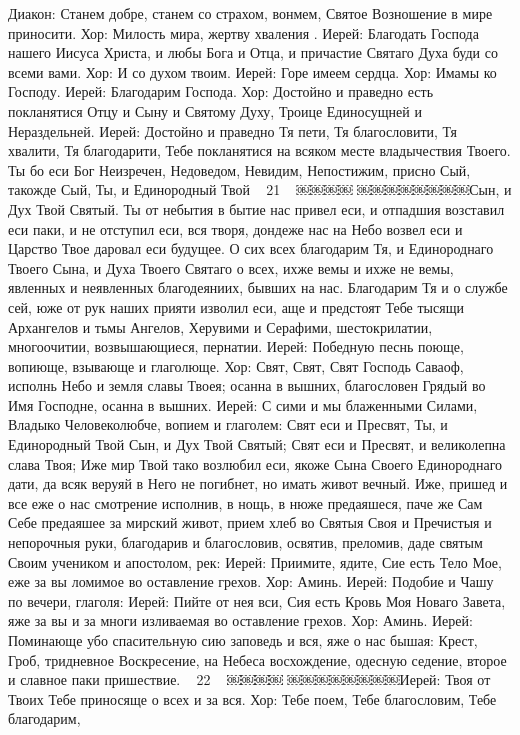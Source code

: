 Диакон: Станем добре, станем со страхом, вонмем, Святое Возношение в мире приносити.
Хор: Милость мира, жертву хваления .
Иерей: Благодать Господа нашего Иисуса Христа, и любы
Бога и Отца, и причастие Святаго Духа буди со всеми вами. Хор: И со духом твоим.
Иерей: Горе имеем сердца.
Хор: Имамы ко Господу.
Иерей: Благодарим Господа.
Хор: Достойно и праведно есть покланятися Отцу и Сыну и
Святому Духу, Троице Единосущней и Нераздельней.
Иерей: Достойно и праведно Тя пети, Тя благословити, Тя хвалити, Тя благодарити, Тебе покланятися на всяком месте владычествия Твоего. Ты бо еси Бог Неизречен, Недоведом, Невидим, Непостижим, присно Сый, такожде Сый, Ты, и Единородный Твой
~ 21 ~
￼￼￼￼
￼￼￼￼￼￼￼￼Сын, и Дух Твой Святый. Ты от небытия в бытие нас привел еси, и отпадшия возставил еси паки, и не отступил еси, вся творя, дондеже нас на Небо возвел еси и Царство Твое даровал еси будущее. О сих всех благодарим Тя, и Единороднаго Твоего Сына, и Духа Твоего Святаго о всех, ихже вемы и ихже не вемы, явленных и неявленных благодеяниих, бывших на нас. Благодарим Тя и о службе сей, юже от рук наших прияти изволил еси, аще и предстоят Тебе тысящи Архангелов и тьмы Ангелов, Херувими и Серафими, шестокрилатии, многоочитии, возвышающиеся, пернатии.
Иерей: Победную песнь поюще, вопиюще, взывающе и глаголюще.
Хор: Свят, Свят, Свят Господь Саваоф, исполнь Небо и земля славы Твоея; осанна в вышних, благословен Грядый во Имя Господне, осанна в вышних.
Иерей: С сими и мы блаженными Силами, Владыко Человеколюбче, вопием и глаголем: Свят еси и Пресвят, Ты, и Единородный Твой Сын, и Дух Твой Святый; Свят еси и Пресвят, и великолепна слава Твоя; Иже мир Твой тако возлюбил еси, якоже Сына Своего Единороднаго дати, да всяк веруяй в Него не погибнет, но имать живот вечный. Иже, пришед и все еже о нас смотрение исполнив, в нощь, в нюже предаяшеся, паче же Сам Себе предаяшее за мирский живот, прием хлеб во Святыя Своя и Пречистыя и непорочныя руки, благодарив и благословив, освятив, преломив, даде святым Своим учеником и апостолом, рек:
Иерей: Приимите, ядите, Сие есть Тело Мое, еже за вы ломимое во оставление грехов.
Хор: Аминь.
Иерей: Подобие и Чашу по вечери, глаголя:
Иерей: Пийте от нея вси, Сия есть Кровь Моя Новаго Завета, яже за вы и за многи изливаемая во оставление грехов.
Хор: Аминь.
Иерей: Поминающе убо спасительную сию заповедь и вся, яже о нас бышая: Крест, Гроб, тридневное Воскресение, на Небеса восхождение, одесную седение, второе и славное паки пришествие.
~ 22 ~
￼￼￼￼
￼￼￼￼￼￼￼￼Иерей: Твоя от Твоих Тебе приносяще о всех и за вся. Хор: Тебе поем, Тебе благословим, Тебе благодарим,
